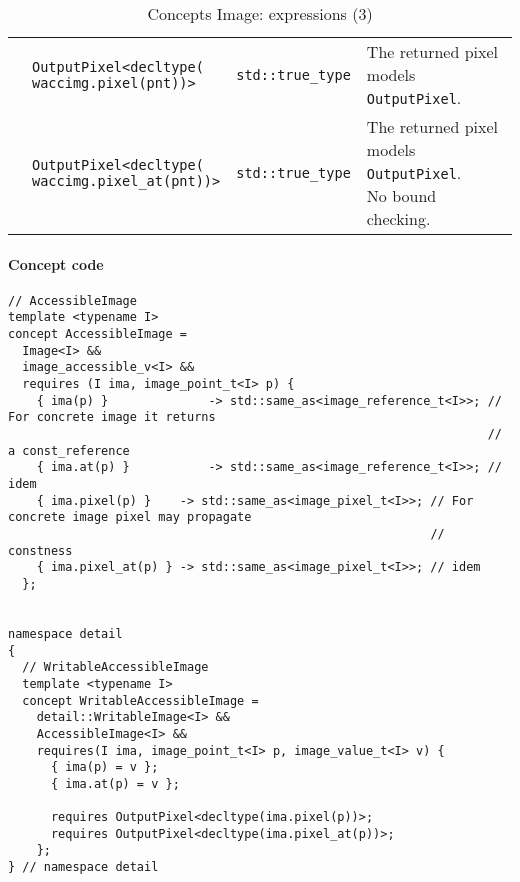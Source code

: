 \begin{table}[htbp]
\begin{scriptsize}
\begin{tabular}{llll}
      \multicolumn{1}{c|}{}                                 & \makecell[l]{\texttt{OutputPixel<decltype(}                                                                                         \\\texttt{waccimg.pixel(pnt))>}}                            & \texttt{std::true\_type}                      & \makecell[l]{The returned pixel \\ models \texttt{OutputPixel}.} \\
      \multicolumn{1}{c|}{}                                 & \makecell[l]{\texttt{OutputPixel<decltype(}                                                                                         \\\texttt{waccimg.pixel\_at(pnt))>}}                            & \texttt{std::true\_type}                      & \makecell[l]{The returned pixel \\ models \texttt{OutputPixel}. \\ No bound checking.} \\
      \cline{1-4}
    \end{tabular}
    \smallskip

    \caption{Concepts Image: expressions (3)}
  \end{scriptsize}
  \label{table:concept.image.expressions.3}
\end{table}

\paragraph{Concept code}

\begin{verbatim}
// AccessibleImage
template <typename I>
concept AccessibleImage =
  Image<I> &&
  image_accessible_v<I> &&
  requires (I ima, image_point_t<I> p) {
    { ima(p) }              -> std::same_as<image_reference_t<I>>; // For concrete image it returns
                                                                   // a const_reference
    { ima.at(p) }           -> std::same_as<image_reference_t<I>>; // idem
    { ima.pixel(p) }    -> std::same_as<image_pixel_t<I>>; // For concrete image pixel may propagate
                                                           // constness
    { ima.pixel_at(p) } -> std::same_as<image_pixel_t<I>>; // idem
  };


namespace detail
{
  // WritableAccessibleImage
  template <typename I>
  concept WritableAccessibleImage =
    detail::WritableImage<I> &&
    AccessibleImage<I> &&
    requires(I ima, image_point_t<I> p, image_value_t<I> v) {
      { ima(p) = v };
      { ima.at(p) = v };

      requires OutputPixel<decltype(ima.pixel(p))>;
      requires OutputPixel<decltype(ima.pixel_at(p))>;
    };
} // namespace detail
\end{verbatim}

